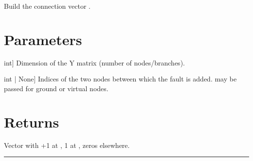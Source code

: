 \documentclass[letterpaper,10pt,english]{sphinxmanual}
\begin{document}
\begin{fulllineitems}
\label{\detokenize{large_change_sensitivity:build_xi}}
\pysigstartsignatures
\pysiglinewithargsret
{}
{\sphinxparamcomma {}\sphinxparamcomma {}}
{}
\pysigstopsignatures
\sphinxAtStartPar
Build the connection vector .


\section{Parameters}
\label{\detokenize{large_change_sensitivity:parameters}}\begin{description}
\sphinxlineitem{n}{[}int{]}
\sphinxAtStartPar
Dimension of the Y matrix (number of nodes/branches).

\sphinxlineitem{idx\_k, idx\_l}{[}int | None{]}
\sphinxAtStartPar
Indices of the two nodes between which the fault is added.
 may be passed for ground or virtual nodes.

\end{description}


\section{Returns}
\label{\detokenize{large_change_sensitivity:returns}}\begin{description}
\sphinxAtStartPar
Vector with +1 at , \sphinxhyphen{}1 at , zeros elsewhere.

\end{description}

\end{fulllineitems}



\bigskip\hrule\bigskip

\end{document}
